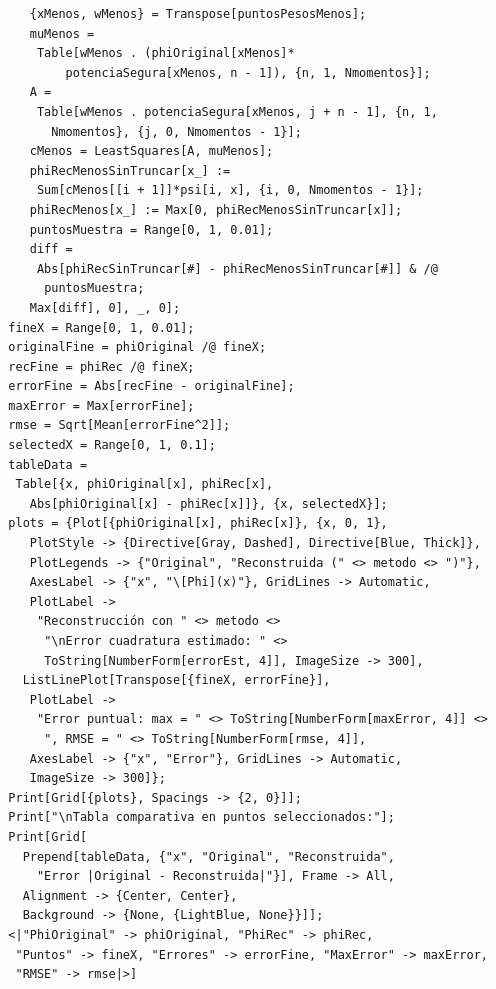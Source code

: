\documentclass[titlepage,11pt]{report}
\begin{document}
\begin{lstlisting}
     {xMenos, wMenos} = Transpose[puntosPesosMenos];
     muMenos = 
      Table[wMenos . (phiOriginal[xMenos]*
          potenciaSegura[xMenos, n - 1]), {n, 1, Nmomentos}];
     A = 
      Table[wMenos . potenciaSegura[xMenos, j + n - 1], {n, 1, 
        Nmomentos}, {j, 0, Nmomentos - 1}];
     cMenos = LeastSquares[A, muMenos];
     phiRecMenosSinTruncar[x_] := 
      Sum[cMenos[[i + 1]]*psi[i, x], {i, 0, Nmomentos - 1}];
     phiRecMenos[x_] := Max[0, phiRecMenosSinTruncar[x]];
     puntosMuestra = Range[0, 1, 0.01];
     diff = 
      Abs[phiRecSinTruncar[#] - phiRecMenosSinTruncar[#]] & /@ 
       puntosMuestra;
     Max[diff], 0], _, 0];
  fineX = Range[0, 1, 0.01];
  originalFine = phiOriginal /@ fineX;
  recFine = phiRec /@ fineX;
  errorFine = Abs[recFine - originalFine];
  maxError = Max[errorFine];
  rmse = Sqrt[Mean[errorFine^2]];
  selectedX = Range[0, 1, 0.1];
  tableData = 
   Table[{x, phiOriginal[x], phiRec[x], 
     Abs[phiOriginal[x] - phiRec[x]]}, {x, selectedX}];
  plots = {Plot[{phiOriginal[x], phiRec[x]}, {x, 0, 1}, 
     PlotStyle -> {Directive[Gray, Dashed], Directive[Blue, Thick]}, 
     PlotLegends -> {"Original", "Reconstruida (" <> metodo <> ")"}, 
     AxesLabel -> {"x", "\[Phi](x)"}, GridLines -> Automatic, 
     PlotLabel -> 
      "Reconstrucción con " <> metodo <> 
       "\nError cuadratura estimado: " <> 
       ToString[NumberForm[errorEst, 4]], ImageSize -> 300], 
    ListLinePlot[Transpose[{fineX, errorFine}], 
     PlotLabel -> 
      "Error puntual: max = " <> ToString[NumberForm[maxError, 4]] <> 
       ", RMSE = " <> ToString[NumberForm[rmse, 4]], 
     AxesLabel -> {"x", "Error"}, GridLines -> Automatic, 
     ImageSize -> 300]};
  Print[Grid[{plots}, Spacings -> {2, 0}]];
  Print["\nTabla comparativa en puntos seleccionados:"];
  Print[Grid[
    Prepend[tableData, {"x", "Original", "Reconstruida", 
      "Error |Original - Reconstruida|"}], Frame -> All, 
    Alignment -> {Center, Center}, 
    Background -> {None, {LightBlue, None}}]];
  <|"PhiOriginal" -> phiOriginal, "PhiRec" -> phiRec, 
   "Puntos" -> fineX, "Errores" -> errorFine, "MaxError" -> maxError, 
   "RMSE" -> rmse|>]
\end{lstlisting}
\end{document}
